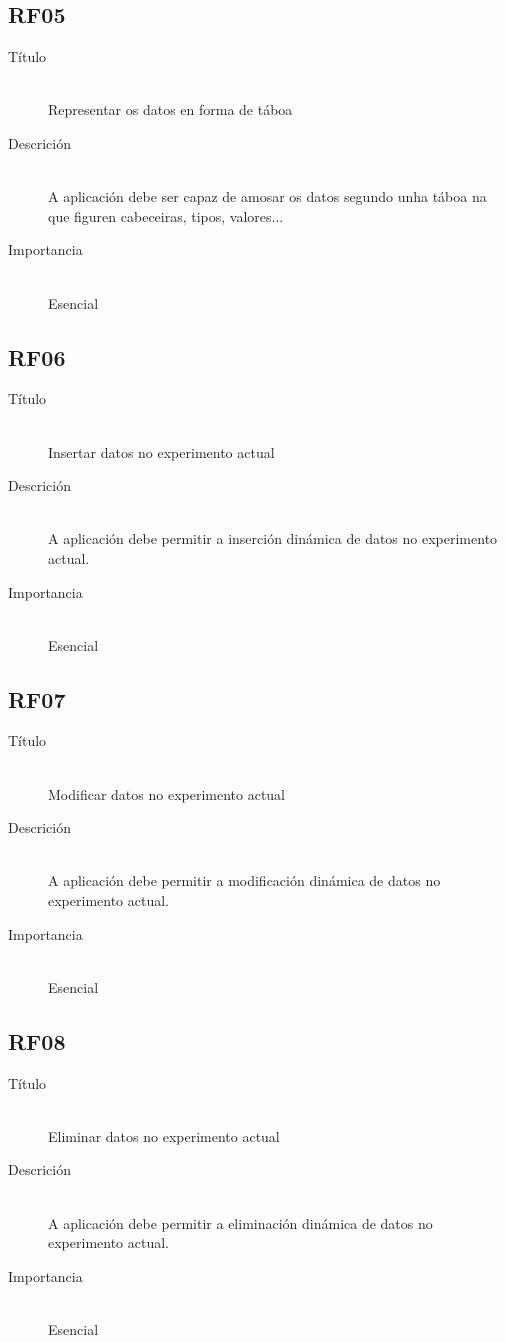 \subsection*{RF05}
\begin{description}
\item[Título] \hfill \\
Representar os datos en forma de táboa
\item[Descrición] \hfill \\
A aplicación debe ser capaz de amosar os datos segundo unha táboa na que figuren cabeceiras, tipos, valores...
\item[Importancia] \hfill \\
Esencial
\end{description}

\subsection*{RF06}
\begin{description}
\item[Título] \hfill \\
Insertar datos no experimento actual
\item[Descrición] \hfill \\
A aplicación debe permitir a inserción dinámica de datos no experimento actual.
\item[Importancia] \hfill \\
Esencial
\end{description}

\subsection*{RF07}
\begin{description}
\item[Título] \hfill \\
Modificar datos no experimento actual
\item[Descrición] \hfill \\
A aplicación debe permitir a modificación dinámica de datos no experimento actual.
\item[Importancia] \hfill \\
Esencial
\end{description}

\subsection*{RF08}
\begin{description}
\item[Título] \hfill \\
Eliminar datos no experimento actual
\item[Descrición] \hfill \\
A aplicación debe permitir a eliminación dinámica de datos no experimento actual.
\item[Importancia] \hfill \\
Esencial
\end{description}

